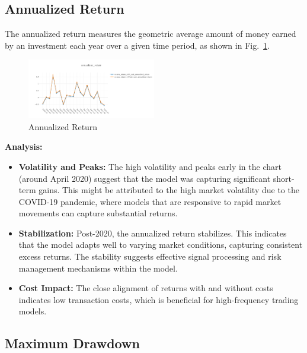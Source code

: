 \documentclass[conference]{IEEEtran}
\begin{document}
\begin{center}
    \subsection*{\textbf{Annualized Return}}
\end{center}

The annualized return measures the geometric average amount of money earned by an investment each year over a given time period, as shown in Fig.~\ref{fig:annualized return}.

\begin{figure}[h!]
\centering
    \includegraphics[width=0.5\textwidth]{annualized_return.png}
    \caption{Annualized Return}
    \label{fig:annualized return}
\end{figure}

\textbf{Analysis:}
\begin{itemize}
    \item \textbf{Volatility and Peaks:} The high volatility and peaks early in the chart (around April 2020) suggest that the model was capturing significant short-term gains. This might be attributed to the high market volatility due to the COVID-19 pandemic, where models that are responsive to rapid market movements can capture substantial returns.
    \item \textbf{Stabilization:} Post-2020, the annualized return stabilizes. This indicates that the model adapts well to varying market conditions, capturing consistent excess returns. The stability suggests effective signal processing and risk management mechanisms within the model.
    \item \textbf{Cost Impact:} The close alignment of returns with and without costs indicates low transaction costs, which is beneficial for high-frequency trading models.
\end{itemize}

\begin{center}
    \subsection*{\textbf{Maximum Drawdown}}
\end{center}
\end{document}
